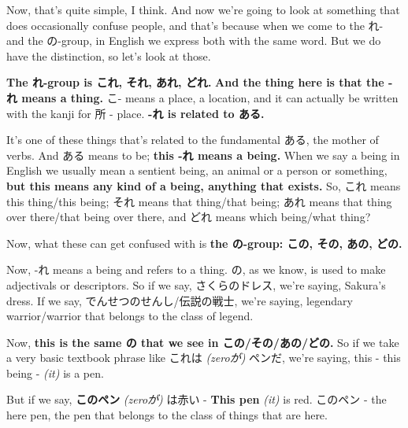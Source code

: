 Now, that's quite simple, I think. And now we're going to look at something that does occasionally confuse people, and that's because when we come to the れ- and the の-group, in English we express both with the same word. But we do have the distinction, so let's look at those.

\stopsectionlevel

\startsectionlevel[title={これ, それ, あれ, どれ},reference={これ-それ-あれ-どれ}]

{}

{\bf The れ-group is これ, それ, あれ, どれ.} {\bf And the thing here is that the -れ means a thing.} こ- means a place, a location, and it can actually be written with the kanji for 所 - place. {\bf -れ is related to ある.}

{}

It's one of these things that's related to the fundamental ある, the mother of verbs. And ある means to be; {\bf this -れ means a being.} When we say a being in English we usually mean a sentient being, an animal or a person or something, {\bf but this means any kind of a being, anything that exists.} So, これ means this thing/this being; それ means that thing/that being; あれ means that thing over there/that being over there, and どれ means which being/what thing?

\stopsectionlevel

\startsectionlevel[title={この, その, あの, どの},reference={この-その-あの-どの}]

Now, what these can get confused with is {\bf the の-group: この, その, あの, どの.}

{}

Now, -れ means a being and refers to a thing. の, as we know, is used to make adjectivals or descriptors. So if we say, さくらのドレス, we're saying, Sakura's dress. If we say, でんせつのせんし/伝説の戦士, we're saying, legendary warrior/warrior that belongs to the class of legend.

\thinrule

Now, {\bf this is the same の that we see in この/その/あの/どの.} So if we take a very basic textbook phrase like これは {\em (zeroが)} ペンだ, we're saying, this - this being - {\em (it)} is a pen.

{}

But if we say, {\bf このペン} {\em (zeroが)} は赤い - {\bf This pen} {\em (it)} is red. このペン - the here pen, the pen that belongs to the class of things that are here.

